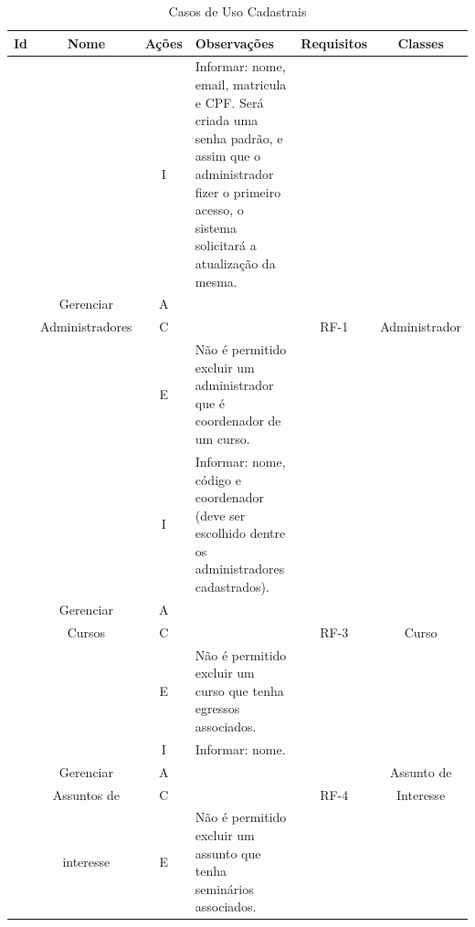 \newpage
\begin{table}[h]
	\centering  \vspace{0.5cm} 	\footnotesize 
	\caption{Casos de Uso Cadastrais}
	\begin{tabular}{|c|c|c|p{6cm}|c|c|} \hline  \rowcolor[rgb]{0.8,0.8,0.8}
 				
 		Id & Nome  &  Ações  &  Observações & Requisitos   & Classes  \\ 	\hline \hline	
 		
 		{}    &    {}    &   I   &    Informar: nome, email, matricula e CPF. Será criada uma senha padrão, e assim que o administrador fizer o primeiro acesso, o sistema solicitará a atualização da mesma.  &   {}   &   {}    \\\cline{3-4}
 		{}  &   Gerenciar    &   A   &   {}   &    {}   &    {}  \\ \cline{3-4}
 		\UC\label{uc-administrador}  &  Administradores  &  C  &   {}    &   RF-1  &   Administrador    \\\cline{3-4}
 	    {}   &  {}   &    E    &    Não é permitido excluir um administrador que é coordenador de um curso.   &  {}  &  {} \\ \hline \hline
 		
 		
 		
 		\rowcolor[rgb]{0.97,0.97,0.97}
 		{}   &  {}   &  I  &   Informar: nome, código e coordenador (deve ser escolhido dentre os administradores cadastrados).   &  {}   &  {}    \\ \cline{3-4} \rowcolor[rgb]{0.97,0.97,0.97}
 		{} &   Gerenciar   &   A   &   {}   &    {}  &    {}   \\ \cline{3-4} \rowcolor[rgb]{0.97,0.97,0.97}
 		\UC\label{uc-curso} &    Cursos   &  C  &  {}  &  RF-3  &  Curso \\ \cline{3-4} \rowcolor[rgb]{0.97,0.97,0.97} 
 		{}    &    {}     &   E   &    Não é permitido excluir um curso que tenha egressos associados.  &  {}   & {} \\ \hline \hline
 		  
 		  
 		  
 		          
 		{}     &   {}    &   I   &    Informar: nome.     &   {}   &    {}    \\ \cline{3-4}
 		{}  &   Gerenciar   &   A   &   {}      &   {}    &    Assunto de   \\\cline{3-4}
 		\UC\label{uc-assunto}  &    Assuntos de   &    C   &    {}     &  RF-4  &    Interesse   \\\cline{3-4}
 		{} & interesse & E & Não é permitido excluir um assunto que tenha seminários associados. & {} & {} \\ \hline \hline
 		

\end{tabular}
\end{table}
